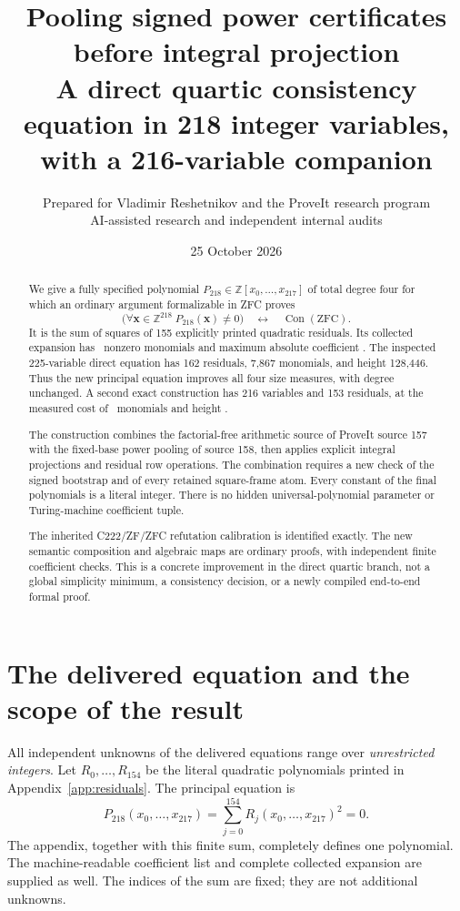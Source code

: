\documentclass[11pt,letterpaper]{article}
\title{\bfseries Pooling signed power certificates before integral projection\\[5pt]
\large A direct quartic consistency equation in 218 integer variables,\\
with a 216-variable companion}
\author{Prepared for Vladimir Reshetnikov and the ProveIt research program\\
\small AI-assisted research and independent internal audits}
\date{25 October 2026}
\theoremstyle{remark}
\newcommand{\Z}{\mathbb Z}
\newcommand{\Con}{\operatorname{Con}}
\newcommand{\ZFC}{\mathrm{ZFC}}
\begin{document}
\maketitle
\begin{abstract}
We give a fully specified polynomial \(P_{218}\in
\Z[x_0,\ldots,x_{217}]\) of total degree four for which an ordinary
argument formalizable in ZFC proves
\[
  \bigl(\forall \mathbf{x}\in\Z^{218}\;P_{218}(\mathbf{x})\ne0\bigr)
  \quad\longleftrightarrow\quad\Con(\ZFC).
\]
It is the sum of squares of 155 explicitly printed quadratic residuals.
Its collected expansion has \MainTerms\ nonzero monomials and maximum
absolute coefficient \MainHeight. The inspected 225-variable direct
equation has 162 residuals, 7,867 monomials, and height 128,446.
Thus the new principal equation improves all four size measures,
with degree unchanged. A second exact construction has 216 variables
and 153 residuals, at the measured cost of \FewTerms\ monomials and
height \FewHeight.

The construction combines the factorial-free arithmetic source of
ProveIt source 157 with the fixed-base power pooling of source 158,
then applies explicit integral projections and residual row operations.
The combination requires a new check of the signed bootstrap and of
every retained square-frame atom. Every constant of the final
polynomials is a literal integer. There is no hidden universal-polynomial
parameter or Turing-machine coefficient tuple.

The inherited C222/ZF/ZFC refutation calibration is identified exactly.
The new semantic composition and algebraic maps are ordinary proofs,
with independent finite coefficient checks. This is a concrete improvement
in the direct quartic branch, not a global simplicity minimum, a
consistency decision, or a newly compiled end-to-end formal proof.
\end{abstract}
\tableofcontents

\section{The delivered equation and the scope of the result}

All independent unknowns of the delivered equations range over
\emph{unrestricted integers}.
Let \(R_0,\ldots,R_{154}\) be the literal quadratic polynomials printed
in Appendix~\ref{app:residuals}. The principal equation is
\begin{equation}\label{eq:principal}
 \boxed{\displaystyle P_{218}(x_0,\ldots,x_{217})
       =\sum_{j=0}^{154}R_j(x_0,\ldots,x_{217})^2=0.}
\end{equation}
The appendix, together with this finite sum, completely defines one
polynomial. The machine-readable coefficient list and complete collected
expansion are supplied as well. The indices of the sum are fixed;
they are not additional unknowns.
\end{document}
